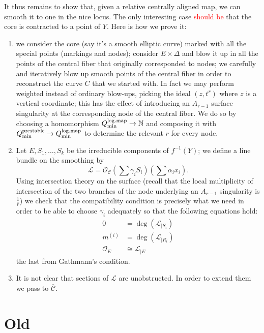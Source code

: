 \documentclass[11pt]{amsart}
\newcommand{\OO}{\mathcal{O}}
\renewcommand{\to}{\rightarrow}
\newcommand{\cC}{\mathcal C}
\newcommand{\dvr}{\Delta}
\theoremstyle{definition}
\theoremstyle{definition}
\begin{document}
It thus remains to show that, given a relative centrally aligned map, we can smooth it to one in the nice locus. The only interesting case \textcolor{red}{should be} that the core is contracted to a point of $Y$. Here is how we prove it:
\begin{enumerate}
 \item we consider the core (say it's a smooth elliptic curve) marked with all the special points (markings and nodes); consider $E\times\dvr$ and blow it up in all the points of the central fiber that originally corresponded to nodes; we carefully and iteratively blow up smooth points of the central fiber in order to reconstruct the curve $C$ that we started with. In fact we may perform weighted instead of ordinary blow-ups, picking the ideal $(z,t^r)$ where $z$ is a vertical coordinate; this has the effect of introducing an $A_{r-1}$ surface singularity at the corresponding node of the central fiber. We do so by choosing a homomorphism $Q_{\rm{min}}^{\rm{log.map}}\to\mathbb N$ and composing it with $Q_{\rm{min}}^{\rm{prestable}}\to Q_{\rm{min}}^{\rm{log.map}}$ to determine the relevant $r$ for every node.
 \item Let $E,S_1,\ldots,S_k$ be the irreducible components of $f^{-1}(Y)$; we define a line bundle on the smoothing by
 \[\mathcal L=\OO_{\cC}\left(\sum \gamma_iS_i\right)\left(\sum \alpha_ix_i\right).\]
 Using intersection theory on the surface (recall that the local multiplicity of intersection of the two branches of the node underlying an $A_{r-1}$ singularity is $\frac{1}{r}$) we check that the compatibility condition is precisely what we need in order to be able to choose $\gamma_i$ adequately so that the following equations hold:
 \begin{align*}
  0&=\deg(\mathcal L_{|S_i}) \\
  m^{(i)}&=\deg(\mathcal L_{|R_i}) \\
  \mathcal O_E&\cong\mathcal L_{|E}
 \end{align*}
 the last from Gathmann's condition.
 \item It is not clear that sections of $\mathcal L$ are unobstructed. In order to extend them we pass to $\overline{\mathcal C}$.
\end{enumerate}

\appendix

\section{Old}
\end{document}
